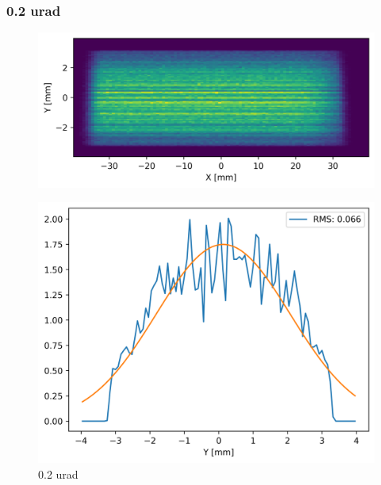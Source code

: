 \clearpage
\subsubsection{0.2 urad}
\begin{figure}[H]
\centering
\includegraphics[width=0.9\linewidth]{./../figures/slope_error/WB4C_d30_d-spacing_gradient_45keV_slope_error02urad.png}
\end{figure}

\begin{figure}[H]
\centering
\includegraphics[width=0.9\linewidth]{./../figures/slope_error/WB4C_d30_d-spacing_gradient_45keV_slope_error02urad_Yprofile.png}
\caption{0.2 urad}
\label{fig:02urad}
\end{figure}

\clearpage

